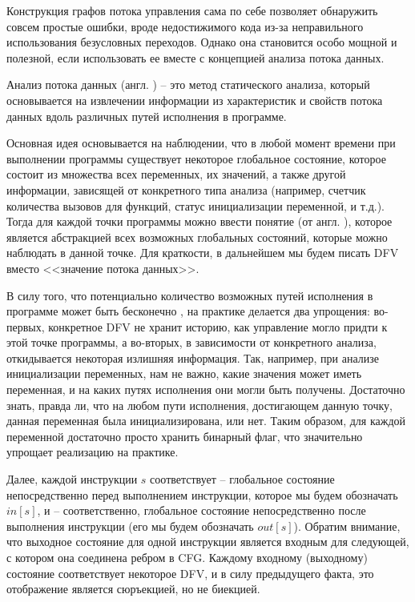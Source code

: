 Конструкция графов потока управления сама по себе позволяет обнаружить совсем простые ошибки, вроде недостижимого кода из-за неправильного использования безусловных переходов. Однако она становится особо мощной и полезной, если использовать ее вместе с концепцией анализа потока данных.

\begin{definition}
  Анализ потока данных (англ. )  -- это метод статического анализа, который основывается на извлечении информации из характеристик и свойств потока данных вдоль различных путей исполнения в программе.
\end{definition}

Основная идея основывается на наблюдении, что в любой момент времени при выполнении программы существует некоторое глобальное состояние, которое состоит из множества всех переменных, их значений, а также другой информации, зависящей от конкретного типа анализа (например, счетчик количества вызовов для функций, статус инициализации переменной, и т.д.). Тогда для каждой точки программы можно ввести понятие  (от англ. ), которое является абстракцией всех возможных глобальных состояний, которые можно наблюдать в данной точке. Для краткости, в дальнейшем мы будем писать DFV вместо <<значение потока данных>>.

В силу того, что потенциально количество возможных путей исполнения в программе может быть бесконечно \cite{dragon-book}, на практике делается два упрощения: во-первых, конкретное DFV не хранит историю, как управление могло придти к этой точке программы, а во-вторых, в зависимости от конкретного анализа, откидывается некоторая излишняя информация. Так, например, при анализе инициализации переменных, нам не важно, какие значения может иметь переменная, и на каких путях исполнения они могли быть получены. Достаточно знать, правда ли, что на любом пути исполнения, достигающем данную точку, данная переменная была инициализирована, или нет. Таким образом, для каждой переменной достаточно просто хранить бинарный флаг, что значительно упрощает реализацию на практике.

Далее, каждой инструкции $s$ соответствует  -- глобальное состояние непосредственно перед выполнением инструкции, которое мы будем обозначать $in[s]$, и  -- соответственно, глобальное состояние непосредственно после выполнения инструкции (его мы будем обозначать $out[s]$). Обратим внимание, что выходное состояние для одной инструкции является входным для следующей, с котором она соединена ребром в CFG. Каждому входному (выходному) состояние соответствует некоторое DFV, и в силу предыдущего факта, это отображение является сюръекцией, но не биекцией.

